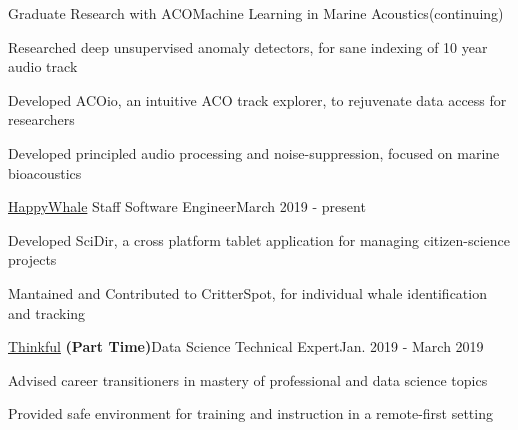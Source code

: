 \documentclass{article}
\newenvironment{**mylist}[2]{
  \subsubsection*{#1\hfill\small#2}
  \small
  \begin{list}{}{}
    \setlength{\topsep}{0pt}
   \setlength{\itemsep}{1pt}
   \setlength{\parskip}{0pt}
   \setlength{\parsep}{0pt}}{\end{list}\normalsize}
\newcommand{\LU}[1]{\hspace{-1em}{\bf Technologies : #1}}
\def\PT{{\bf(Part Time)}\xspace}
\begin{document}
\begin{**mylist}{Graduate Research with ACO\tabb Machine Learning in Marine Acoustics}{(continuing)}
\item Researched deep unsupervised anomaly detectors, for sane indexing of 10 year audio track
\item Developed ACOio, %
  an intuitive ACO track explorer, to rejuvenate data access for researchers
\item Developed principled audio processing and noise-suppression, focused on marine bioacoustics
\item \LU{Python, ACOio, tensorflow, scipy.signal, Jupyter}
\end{**mylist}

\begin{**mylist}{\href{www.happywhale.com}{HappyWhale} \tabb Staff Software Engineer}{March 2019 - present}
\item Developed SciDir, a cross platform tablet application for managing citizen-science projects
\item Mantained and Contributed to CritterSpot, for individual whale identification and tracking
\item \LU{NativeScript, Angular, node.js, Android, PostgreSQL}
\end{**mylist}

\begin{**mylist}{\href{www.thinkful.com}{Thinkful} \PT \tabb Data Science Technical Expert}{Jan. 2019 - March 2019}
\item Advised career transitioners in mastery of professional and data science topics
\item Provided safe environment for training and instruction in a remote-first setting
\end{**mylist}
\end{document}
